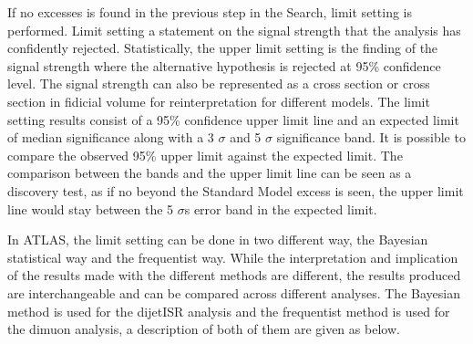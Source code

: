 If no excesses is found in the previous step in the Search, limit setting is performed. Limit setting a statement on the signal strength that the analysis has confidently rejected. Statistically, the upper limit setting is the finding of the signal strength where the alternative hypothesis is rejected at 95\% confidence level. The signal strength can also be represented as a cross section or cross section in fidicial volume for reinterpretation for different models. 
The limit setting results consist of a 95\% confidence upper limit line and an expected limit of median significance along with a 3 $\sigma$ and 5 $\sigma$ significance band. It is possible to compare the observed 95\% upper limit against the expected limit. The comparison between the bands and the upper limit line can be seen as a discovery test, as if no beyond the Standard Model excess is seen, the upper limit line would stay between the 5 $\sigma$s error band in the expected limit. 

In ATLAS, the limit setting can be done in two different way, the Bayesian statistical way and the frequentist way. While the interpretation and implication of the results made with the different methods are different, the results produced are interchangeable and can be compared across different analyses. 
The Bayesian method is used for the dijetISR analysis and the frequentist method is used for the dimuon analysis, a description of both of them are given as below.

%



